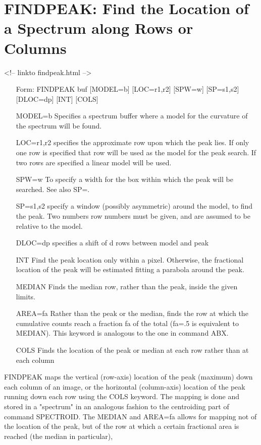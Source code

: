 \section{FINDPEAK: Find the Location of a Spectrum along Rows or
         Columns}
\begin{rawhtml}
<!-- linkto findpeak.html -->
\end{rawhtml}
\begin{itemize}
  \item[Form: FINDPEAK buf {[MODEL=b]} {[LOC=r1,r2]} {[SPW=w]} {[SP=s1,s2]}
       {[DLOC=dp]} {[INT]} {[COLS]}\hfill]{}
  \item[MODEL=b]{Specifies a spectrum buffer where a model for the
       curvature of the spectrum will be found.}
  \item[LOC=r1,r2]{specifies the approximate row upon which the peak lies.
       If only one row is specified that row will be used as
       the model for the peak search. If two rows are specified 
       a linear model will be used.}
  \item[SPW=w]{To specify a width for the box within which the peak
       will be searched. See also SP=.}
  \item[SP=s1,s2]{specify a window (possibly asymmetric) around the model,
       to find the peak. Two numbers row numbers must be given,
       and are assumed to be relative to the model.}
  \item[DLOC=dp]{specifies a shift of d rows between model and peak}
  \item[INT]{Find the peak location only within a pixel. Otherwise,
       the fractional location of the peak will be estimated
       fitting a parabola around the peak.}
  \item[MEDIAN]{Finds the median row, rather than the peak, inside
       the given limits.}
  \item[AREA=fa]{Rather than the peak or the median, finds the row at 
       which the cumulative counts reach a fraction fa of the 
       total (fa=.5 is equivalent to MEDIAN). This keyword is
       analogous to the one in command ABX.}
  \item[COLS]{Finds the location of the peak or median at each row
       rather than at each column}
\end{itemize}

FINDPEAK maps the vertical (row-axis) location of the peak (maximum) down
each column of an image, or the horizontal (column-axis) location of the
peak running down each row using the COLS keyword. The mapping is done and
stored in a "spectrum" in an analogous fashion to the centroiding part of
command SPECTROID. The MEDIAN and AREA=fa allows for mapping not of the
location of the peak, but of the row at which a certain fractional area is
reached (the median in particular),

